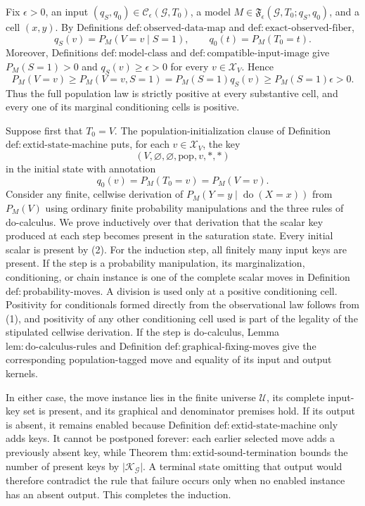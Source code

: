 Fix \(\epsilon>0\), an input \((q_S,q_0)\in\mathcal C_{\epsilon}(\mathcal G,T_0)\), a model \(M\in\mathfrak F_{\epsilon}(\mathcal G,T_0;q_S,q_0)\), and a cell \((x,y)\). By Definitions \(\mathrm{def{:}observed\text{-}data\text{-}map}\) and \(\mathrm{def{:}exact\text{-}observed\text{-}fiber}\),
\[
 q_S(v)=P_M(V=v\mid S=1),
 \qquad
 q_0(t)=P_M(T_0=t).
\]
Moreover, Definitions \(\mathrm{def{:}model\text{-}class}\) and \(\mathrm{def{:}compatible\text{-}input\text{-}image}\) give \(P_M(S=1)>0\) and \(q_S(v)\geq\epsilon>0\) for every \(v\in\mathcal X_V\). Hence
\[
 P_M(V=v)\geq P_M(V=v,S=1)
 =P_M(S=1)q_S(v)
 \geq P_M(S=1)\epsilon>0.
 \tag{1}
\]
Thus the full population law is strictly positive at every substantive cell, and every one of its marginal conditioning cells is positive.

Suppose first that \(T_0=V\). The population-initialization clause of Definition \(\mathrm{def{:}extid\text{-}state\text{-}machine}\) puts, for each \(v\in\mathcal X_V\), the key
\[
 (V,\varnothing,\varnothing,\mathrm{pop},v,\ast,\ast)
\]
in the initial state with annotation
\[
 q_0(v)=P_M(T_0=v)=P_M(V=v).
 \tag{2}
\]
Consider any finite, cellwise derivation of \(P_M(Y=y\mid\operatorname{do}(X=x))\) from \(P_M(V)\) using ordinary finite probability manipulations and the three rules of do-calculus. We prove inductively over that derivation that the scalar key produced at each step becomes present in the saturation state. Every initial scalar is present by (2). For the induction step, all finitely many input keys are present. If the step is a probability manipulation, its marginalization, conditioning, or chain instance is one of the complete scalar moves in Definition \(\mathrm{def{:}probability\text{-}moves}\). A division is used only at a positive conditioning cell. Positivity for conditionals formed directly from the observational law follows from (1), and positivity of any other conditioning cell used is part of the legality of the stipulated cellwise derivation. If the step is do-calculus, Lemma \(\mathrm{lem{:}do\text{-}calculus\text{-}rules}\) and Definition \(\mathrm{def{:}graphical\text{-}fixing\text{-}moves}\) give the corresponding population-tagged move and equality of its input and output kernels.

In either case, the move instance lies in the finite universe \(\mathscr U\), its complete input-key set is present, and its graphical and denominator premises hold. If its output is absent, it remains enabled because Definition \(\mathrm{def{:}extid\text{-}state\text{-}machine}\) only adds keys. It cannot be postponed forever: each earlier selected move adds a previously absent key, while Theorem \(\mathrm{thm{:}extid\text{-}sound\text{-}termination}\) bounds the number of present keys by \(\lvert\mathscr K_{\mathcal G}\rvert\). A terminal state omitting that output would therefore contradict the rule that failure occurs only when no enabled instance has an absent output. This completes the induction.

